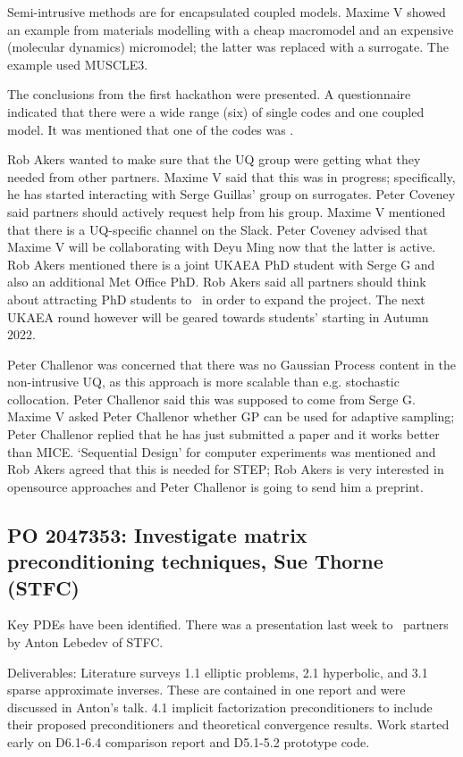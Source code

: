 Semi-intrusive methods are for encapsulated coupled models.  Maxime V showed an 
example from materials modelling with a cheap macromodel and an expensive 
(molecular dynamics) micromodel; the latter was replaced with a surrogate.  The 
example used MUSCLE3.

The conclusions from the first hackathon were presented. A questionnaire
indicated that there were a wide range (six) of 
single codes and one coupled model.  It was mentioned that one of the codes was 
.

Rob Akers wanted to make sure that the UQ group were getting what they needed 
from other partners.  Maxime V said that this was in progress; specifically, he 
has started interacting with Serge Guillas' group on surrogates.  Peter Coveney 
said partners should actively request help from his group.  Maxime V mentioned 
that there is a UQ-specific channel on the Slack.  Peter Coveney advised that 
Maxime V will be collaborating with Deyu Ming now that the latter is active.  
Rob Akers mentioned there is a joint UKAEA PhD student with Serge G and also an 
additional Met Office PhD.  Rob Akers said all partners should think about 
attracting PhD students to \nep\  in order to expand the project. The next UKAEA
round however will be geared towards students' starting in Autumn 2022.

Peter Challenor was concerned that there was no Gaussian Process content in the 
non-intrusive UQ, as this approach is more scalable than e.g. stochastic 
collocation.  Peter Challenor said this was supposed to come from Serge G.  
Maxime V asked Peter Challenor whether GP can be used for adaptive sampling; 
Peter Challenor replied that he has just submitted a paper and it works better 
than MICE.  `Sequential Design' for computer experiments was mentioned and Rob 
Akers agreed that this is needed for STEP; Rob Akers is very interested in 
opensource approaches and Peter Challenor is going to send him a preprint.


\subsection{PO 2047353: Investigate matrix preconditioning techniques, Sue Thorne (STFC)}

Key PDEs have been identified.  There was a presentation last week to \nep\  
partners by Anton Lebedev of STFC.

Deliverables: Literature surveys 1.1 elliptic problems, 2.1 hyperbolic, and 3.1 
sparse approximate inverses.  These are contained in one report and were 
discussed in Anton's talk.  4.1 implicit factorization preconditioners to 
include their proposed preconditioners and theoretical convergence results.
Work started early  on  D6.1-6.4 comparison report and D5.1-5.2 prototype code.

